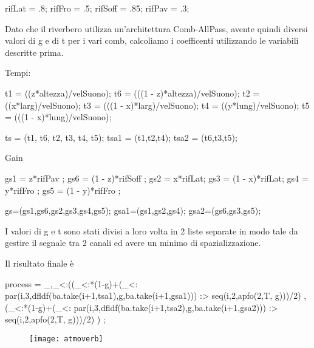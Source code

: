 \begin{code}
rifLat = .8;
rifFro = .5;
rifSoff = .85;
rifPav = .3;
\end{code}

Dato che il riverbero utilizza un'architettura Comb-AllPass, avente quindi diversi valori di g e di t
per i vari comb, calcoliamo i coefficenti utilizzando le variabili descritte prima.

\bigskip

Tempi:
\begin{code}
t1 = ((z*altezza)/velSuono);
t6 = (((1 - z)*altezza)/velSuono);
t2 = ((x*larg)/velSuono);
t3 = (((1 - x)*larg)/velSuono);
t4 = ((y*lung)/velSuono);
t5 = (((1 - x)*lung)/velSuono);

ts = (t1, t6, t2, t3, t4, t5);
tsa1 = (t1,t2,t4);
tsa2 = (t6,t3,t5);
\end{code}

Gain
\begin{code}
gs1 = z*rifPav ;
gs6 = (1 - z)*rifSoff ;
gs2 = x*rifLat;
gs3 = (1 - x)*rifLat;
gs4 = y*rifFro ;
gs5 = (1 - y)*rifFro ;

gs=(gs1,gs6,gs2,gs3,gs4,gs5);
gsa1=(gs1,gs2,gs4);
gsa2=(gs6,gs3,gs5);
\end{code}

I valori di g e t sono stati divisi a loro volta in 2 liste separate in modo tale da gestire
il segnale tra 2 canali ed avere un minimo di spazializzazione.

Il risultato finale è

\begin{code}
process = _,_<:((_<:*(1-g)+(_<: par(i,3,dfldf(ba.take(i+1,tsa1),g,ba.take(i+1,gsa1))) :>
seq(i,2,apfo(2,T, g)))/2) ,(_<:*(1-g)+(_<: par(i,3,dfldf(ba.take(i+1,tsa2),g,ba.take(i+1,gsa2))) :>
seq(i,2,apfo(2,T, g)))/2) ) ;
\end{code}

\begin{figure}[htp]
\centering
\texttt{[image: atmoverb]}
\label{fig:atmoverb}
\end{figure}

